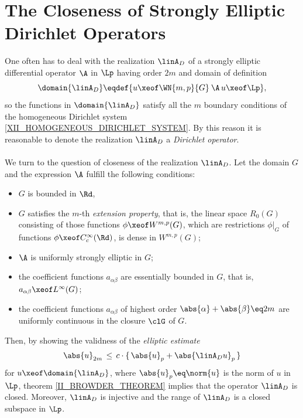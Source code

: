 \documentclass[11pt,twoside]{article}
\def\G{G}
\begin{document}
\section{The Closeness of Strongly Elliptic Dirichlet Operators}
One often has to deal with the realization $\linA_D$
of a strongly elliptic differential operator $\A$ in $\Lp$
having order $2m$ and domain of definition
\[
\domain{\linA_D} \eqdef \{ u \xeof \WN{m,p}{\G} \: \A\,u \xeof \Lp \},
\]
so the functions in $\domain{\linA_D}$ satisfy all the $m$ boundary conditions
of the homogeneous Dirichlet system \eqref{XII_HOMOGENEOUS_DIRICHLET_SYSTEM}.
By this reason it is reasonable to denote the realization $\linA_D$
a \textit{Dirichlet operator}.

\paragraph{} %
We turn to the question of closeness of the realization $\linA_D$.
Let the domain $\G$ and the expression $\A$ fulfill the following conditions:

\begin{itemize}[leftmargin=9mm]
\item[(I)\;\;]
$\G$ is bounded in $\Rd$,

\item[(I')\;\,]
$\G$ satisfies the $m$-th \textit{extension property},
that is,
the linear space $R_0(\G)$ consisting
of those functions $\phi \xeof W^{m,p}(\G)$,
which are restrictions $\phi |_{\G}$
of functions $\phi \xeof C_c^{\infty}(\Rd)$,
is dense in $W^{m,p}(\G)$;

\item[(II)\;]
$\A$ is uniformly strongly elliptic in $\G$;

\item[(III)\,]
the coefficient functions $a_{\alpha \beta}$ are essentially bounded in $\G$,
that is,
$a_{\alpha \beta} \xeof L^{\infty}(\G)$;

\item[(III')]
the coefficient functions $a_{\alpha \beta}$ of highest order
$\abs{\alpha} + \abs{\beta} \eq 2m$ are uniformly continuous in the closure
$\clG$ of $\G$.
\end{itemize}

Then,
by showing the validness of the \textit{elliptic estimate}
\[
\abs{u} _{2m} \, \leq \, c \cdot \{ \,\abs{u} _p + \abs{\linA_D u} _p \, \}
\]
for $u \xeof \domain{\linA_D}$,
where $\abs{u} _p \eq \norm{u}$ is the norm of $u$ in $\Lp$,
theorem \ref{II_BROWDER_THEOREM} implies that the operator $\linA_D$ is closed.
Moreover,
$\linA_D$ is injective and the range of $\linA_D$ is a closed subspace in $\Lp$.
\end{document}
